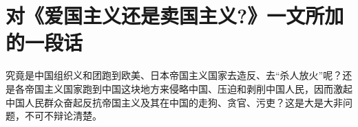 \section[对《爱国主义还是卖国主义?》一文所加的一段话（一九六七年四月）]{对《爱国主义还是卖国主义?》一文所加的一段话}


究竟是中国组织义和团跑到欧美、日本帝国主义国家去造反、去“杀人放火”呢？还是各帝国主义国家跑到中国这块地方来侵略中国、压迫和剥削中国人民，因而激起中国人民群众奋起反抗帝国主义及其在中国的走狗、贪官、污吏？这是大是大非问题，不可不辩论清楚。


